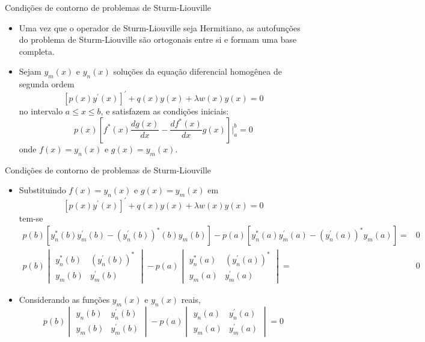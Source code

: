       \begin{slide}[toc=]{Condições de contorno de problemas de Sturm-Liouville}
		\begin{itemize}
			\item Uma vez que o operador de Sturm-Liouville seja Hermitiano, as autofunções do problema de Sturm-Liouville são ortogonais entre si e formam uma base completa.
			\item Sejam $y_m(x)$ e $y_n(x)$ soluções da equação diferencial homogênea de segunda ordem 
				\begin{equation*}
					\left [ p(x)y^\prime (x)\right ]^\prime + q(x)y(x) + \lambda w(x)y(x) = 0
				\end{equation*}
				no intervalo $a\leq x\leq b$, e satisfazem as condições iniciais:
				\begin{equation*}
					p(x)\left [ f^\ast (x)\frac{dg(x)}{dx}-\frac{df^\ast(x)}{dx}g(x)\right ]\Bigg \vert_a^b = 0
				\end{equation*}
				onde $f(x) = y_n(x)$ e $g(x) = y_m(x)$.
		\end{itemize}
      \end{slide}

      \begin{slide}[toc=]{Condições de contorno de problemas de Sturm-Liouville}
		\begin{itemize}
			\item Substituindo $f(x) = y_n(x)$ e $g(x) = y_m(x)$ em 
				\begin{equation*}
					\left [ p(x)y^\prime (x)\right ]^\prime + q(x)y(x) + \lambda w(x)y(x) = 0
				\end{equation*}
				tem-se
				\begin{align*}
					p(b)\left [ y_n^\ast(b)y_m^\prime(b)-(y_n^\prime(b))^\ast(b)y_m(b)\right ] - p(a)\left [ y_n^\ast(a)y_m^\prime(a)-(y_n^\prime(a))^\ast y_m(a)\right ] =& 0\\
					p(b)\begin{vmatrix}y_n^\ast(b) & (y_n^\prime(b))^\ast\\ y_m(b) & y_m^\prime(b)\end{vmatrix}-p(a)\begin{vmatrix}y_n^\ast(a) & (y_n^\prime(a))^\ast\\ y_m(a) & y_m^\prime(a)\end{vmatrix}=& 0
				\end{align*}
			\item Considerando as funções $y_m(x)$ e $y_n(x)$ reais, 
				\begin{equation*}
					p(b)\begin{vmatrix}y_n(b) & y_n^\prime(b)\\ y_m(b) & y_m^\prime(b)\end{vmatrix}-p(a)\begin{vmatrix}y_n(a) & y_n^\prime(a)\\ y_m(a) & y_m^\prime(a)\end{vmatrix}= 0
				\end{equation*}
		\end{itemize}
      \end{slide}
